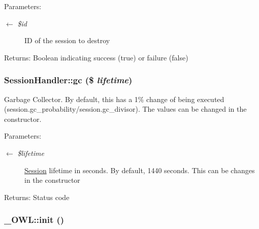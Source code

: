 \begin{Desc}
\item[Parameters:]
\begin{description}
\item[\mbox{$\leftarrow$} {\em \$id}]ID of the session to destroy \end{description}
\end{Desc}
\begin{Desc}
\item[Returns:]Boolean indicating success (true) or failure (false) \end{Desc}
\hypertarget{classSessionHandler_c33097332375ae3f8a43c31cef6db0e8}{
\subsubsection{\setlength{\rightskip}{0pt plus 5cm}SessionHandler::gc (\$ {\em lifetime})}}
\label{classSessionHandler_c33097332375ae3f8a43c31cef6db0e8}


Garbage Collector. By default, this has a 1\% change of being executed (session.gc\_\-probability/session.gc\_\-divisor). The values can be changed in the constructor.

\begin{Desc}
\item[Parameters:]
\begin{description}
\item[\mbox{$\leftarrow$} {\em \$lifetime}]\hyperlink{classSession}{Session} lifetime in seconds. By default, 1440 seconds. This can be changes in the constructor \end{description}
\end{Desc}
\begin{Desc}
\item[Returns:]Status code \end{Desc}
\hypertarget{class__OWL_e0ef3ded56e8a6b34b6461e5a721cd3e}{
\subsubsection{\setlength{\rightskip}{0pt plus 5cm}\_\-OWL::init ()}}
\label{class__OWL_e0ef3ded56e8a6b34b6461e5a721cd3e}


